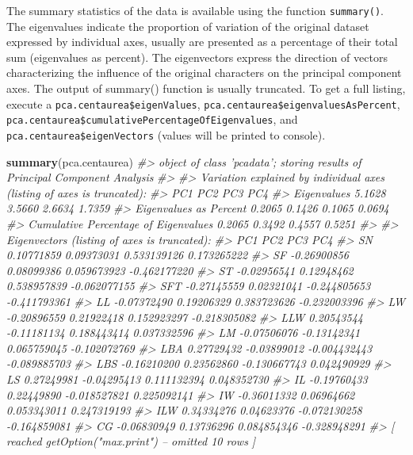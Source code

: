 \documentclass[
]{article}
\newenvironment{Shaded}{\begin{snugshade}}{\end{snugshade}}
\newcommand{\CommentTok}[1]{\textcolor[rgb]{0.56,0.35,0.01}{\textit{#1}}}
\newcommand{\KeywordTok}[1]{\textcolor[rgb]{0.13,0.29,0.53}{\textbf{#1}}}
\newcommand{\NormalTok}[1]{#1}
\begin{document}
The summary statistics of the data is available using the function
\texttt{summary()}. The eigenvalues indicate the proportion of variation
of the original dataset expressed by individual axes, usually are
presented as a percentage of their total sum (eigenvalues as percent).
The eigenvectors express the direction of vectors characterizing the
influence of the original characters on the principal component axes.
The output of summary() function is usually truncated. To get a full
listing, execute a \texttt{pca.centaurea\$eigenValues},
\texttt{pca.centaurea\$eigenvaluesAsPercent},
\texttt{pca.centaurea\$cumulativePercentageOfEigenvalues}, and
\texttt{pca.centaurea\$eigenVectors} (values will be printed to
console).

\begin{Shaded}
\begin{Highlighting}[]
\KeywordTok{summary}\NormalTok{(pca.centaurea)}
\CommentTok{#> object of class 'pcadata'; storing results of Principal Component Analysis}
\CommentTok{#> }
\CommentTok{#> Variation explained by individual axes (listing of axes is truncated):}
\CommentTok{#>                                         PC1    PC2    PC3    PC4}
\CommentTok{#> Eigenvalues                          5.1628 3.5660 2.6634 1.7359}
\CommentTok{#> Eigenvalues as Percent               0.2065 0.1426 0.1065 0.0694}
\CommentTok{#> Cumulative Percentage of Eigenvalues 0.2065 0.3492 0.4557 0.5251}
\CommentTok{#> }
\CommentTok{#> Eigenvectors (listing of axes is truncated):}
\CommentTok{#>             PC1         PC2          PC3          PC4}
\CommentTok{#> SN   0.10771859  0.09373031  0.533139126  0.173265222}
\CommentTok{#> SF  -0.26900856  0.08099386  0.059673923 -0.462177220}
\CommentTok{#> ST  -0.02956541  0.12948462  0.538957839 -0.062077155}
\CommentTok{#> SFT -0.27145559  0.02321041 -0.244805653 -0.411793361}
\CommentTok{#> LL  -0.07372490  0.19206329  0.383723626 -0.232003396}
\CommentTok{#> LW  -0.20896559  0.21922418  0.152923297 -0.218305082}
\CommentTok{#> LLW  0.20543544 -0.11181134  0.188443414  0.037332596}
\CommentTok{#> LM  -0.07506076 -0.13142341  0.065759045 -0.102072769}
\CommentTok{#> LBA  0.27729432 -0.03899012 -0.004432443 -0.089885703}
\CommentTok{#> LBS -0.16210200  0.23562860 -0.130667743  0.042490929}
\CommentTok{#> LS   0.27249981 -0.04295413  0.111132394  0.048352730}
\CommentTok{#> IL  -0.19760433  0.22449890 -0.018527821  0.225092141}
\CommentTok{#> IW  -0.36011332  0.06964662  0.053343011  0.247319193}
\CommentTok{#> ILW  0.34334276  0.04623376 -0.072130258 -0.164859081}
\CommentTok{#> CG  -0.06830949  0.13736296  0.084854346 -0.328948291}
\CommentTok{#>  [ reached getOption("max.print") -- omitted 10 rows ]}
\end{Highlighting}
\end{Shaded}
\end{document}
